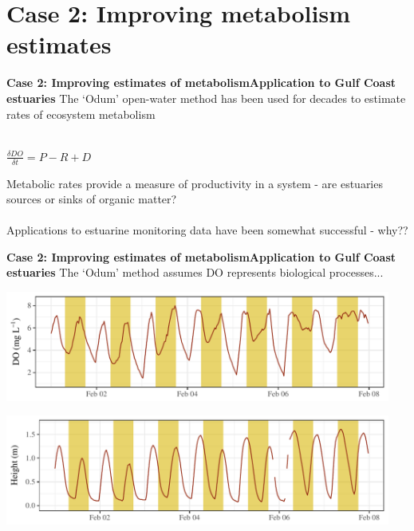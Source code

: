 \documentclass[serif]{beamer}\usepackage[]{graphicx}\usepackage[]{color}
\begin{document}
\section{Case 2: Improving metabolism estimates}

\begin{frame}{\textbf{Case 2: Improving estimates of metabolism}}{\textbf{Application to Gulf Coast estuaries}}
The `Odum' open-water method has been used for decades to estimate rates of ecosystem metabolism \scriptsize \cite{Odum56} \\~\\
\normalsize
\begin{center}
$\frac{\delta DO}{\delta t} = P - R + D$
\end{center}
Metabolic rates provide a measure of productivity in a system - are estuaries sources or sinks of organic matter? \scriptsize \cite{Caffrey14}
\normalsize \\~\\
Applications to estuarine monitoring data have been somewhat successful - why?? 
\end{frame}

\begin{frame}{\textbf{Case 2: Improving estimates of metabolism}}{\textbf{Application to Gulf Coast estuaries}}
The `Odum' method assumes DO represents biological processes...


{\centering \includegraphics[width=0.95\textwidth]{fig/sapdo-1} 

}





{\centering \includegraphics[width=0.95\textwidth]{fig/saptide-1} 

}



\end{frame}
\end{document}
